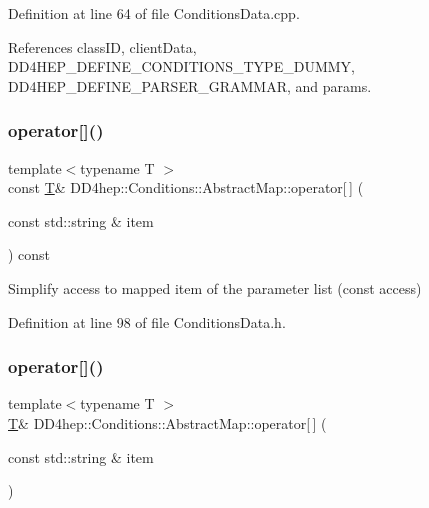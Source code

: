 Definition at line 64 of file Conditions\+Data.\+cpp.



References class\+ID, client\+Data, D\+D4\+H\+E\+P\+\_\+\+D\+E\+F\+I\+N\+E\+\_\+\+C\+O\+N\+D\+I\+T\+I\+O\+N\+S\+\_\+\+T\+Y\+P\+E\+\_\+\+D\+U\+M\+MY, D\+D4\+H\+E\+P\+\_\+\+D\+E\+F\+I\+N\+E\+\_\+\+P\+A\+R\+S\+E\+R\+\_\+\+G\+R\+A\+M\+M\+AR, and params.

\hypertarget{class_d_d4hep_1_1_conditions_1_1_abstract_map_a2cbca03ad9ab72db2d441433e1261de0}{}\label{class_d_d4hep_1_1_conditions_1_1_abstract_map_a2cbca03ad9ab72db2d441433e1261de0} 
\subsubsection{\texorpdfstring{operator[]()}{operator[]()}\hspace{0.1cm}{\footnotesize\ttfamily [1/2]}}
{\footnotesize\ttfamily template$<$typename T $>$ \\
const \hyperlink{class_t}{T}\& D\+D4hep\+::\+Conditions\+::\+Abstract\+Map\+::operator\mbox{[}$\,$\mbox{]} (\begin{DoxyParamCaption}\item[{const std\+::string \&}]{item }\end{DoxyParamCaption}) const\hspace{0.3cm}{\ttfamily [inline]}}



Simplify access to mapped item of the parameter list (const access) 



Definition at line 98 of file Conditions\+Data.\+h.

\hypertarget{class_d_d4hep_1_1_conditions_1_1_abstract_map_a29fc7ce5409ad6c0ec94b217225b3e78}{}\label{class_d_d4hep_1_1_conditions_1_1_abstract_map_a29fc7ce5409ad6c0ec94b217225b3e78} 
\subsubsection{\texorpdfstring{operator[]()}{operator[]()}\hspace{0.1cm}{\footnotesize\ttfamily [2/2]}}
{\footnotesize\ttfamily template$<$typename T $>$ \\
\hyperlink{class_t}{T}\& D\+D4hep\+::\+Conditions\+::\+Abstract\+Map\+::operator\mbox{[}$\,$\mbox{]} (\begin{DoxyParamCaption}\item[{const std\+::string \&}]{item }\end{DoxyParamCaption})\hspace{0.3cm}{\ttfamily [inline]}}



